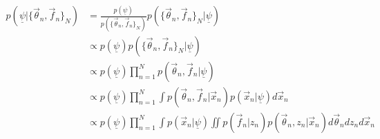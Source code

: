 \documentclass[12pt, onecolumn]{emulateapj}
\newcommand{\textul}{\underline}
\begin{document}
\begin{align*}
p(\textul{\psi}|\{\vec{\theta}_{n},\vec{f}_{n}\}_{N}) &= \frac{p(\textul{\psi})}{p(\{\vec{\theta}_{n},\vec{f}_{n}\}_{N})}p(\{\vec{\theta}_{n},\vec{f}_{n}\}_{N}|\textul{\psi})\\
&\propto p(\textul{\psi})p(\{\vec{\theta}_{n},\vec{f}_{n}\}_{N}|\textul{\psi})\\
&\propto p(\textul{\psi})\prod_{n=1}^{N}p(\vec{\theta}_{n},\vec{f}_{n}|\textul{\psi})\\
&\propto p(\textul{\psi})\prod_{n=1}^{N}\int p(\vec{\theta}_{n},\vec{f}_{n}|\vec{x}_{n})p(\vec{x}_{n}|\textul{\psi})d\vec{x}_{n}\\
&\propto p(\textul{\psi})\prod_{n=1}^{N}\int p(\vec{x}_{n}|\textul{\psi})\iint p(\vec{f}_{n}|z_{n})p(\vec{\theta}_{n},z_{n}|\vec{x}_{n})d\vec{\theta}_{n}dz_{n}d\vec{x}_{n}\\
\end{align*}
%
%
%
%
%
%
\end{document}
